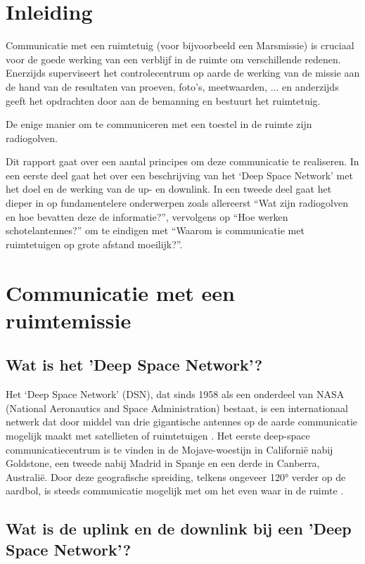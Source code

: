\section{Inleiding}

Communicatie met een ruimtetuig (voor bijvoorbeeld een Marsmissie) is cruciaal voor de goede werking van een verblijf in de ruimte om verschillende redenen. Enerzijds superviseert het controlecentrum op aarde de werking van de missie aan de hand van de resultaten van proeven, foto’s, meetwaarden, ... en anderzijds geeft het opdrachten door aan de bemanning en bestuurt het ruimtetuig.

De enige manier om te communiceren met een toestel in de ruimte zijn radiogolven.

Dit rapport gaat over een aantal principes om deze communicatie te realiseren. In een eerste deel gaat het over een beschrijving van het ‘Deep Space Network’ met het doel en de werking van de up- en downlink. In een tweede deel gaat het dieper in op fundamentelere onderwerpen zoals allereerst “Wat zijn radiogolven en hoe bevatten deze de informatie?”, vervolgens op “Hoe werken schotelantennes?” om te eindigen met “Waarom is communicatie met ruimtetuigen op grote afstand moeilijk?”.

\section{Communicatie met een ruimtemissie}

\subsection{Wat is het 'Deep Space Network'?}

Het ‘Deep Space Network’ (DSN), dat sinds 1958 als een onderdeel van NASA (National Aeronautics and Space Administration) bestaat, is een internationaal netwerk dat door middel van drie gigantische antennes op de aarde communicatie mogelijk maakt met satellieten of ruimtetuigen \cite{martin}. Het eerste deep-space communicatiecentrum is te vinden in de Mojave-woestijn in Californië nabij Goldstone, een tweede nabij Madrid in Spanje en een derde in Canberra, Australië. Door deze geografische spreiding, telkens ongeveer 120° verder op de aardbol, is steeds communicatie mogelijk met om het even waar in de ruimte \cite{christiaens}. 

\subsection{Wat is de uplink en de downlink bij een 'Deep Space Network'?}


